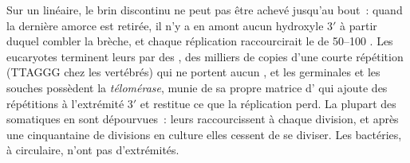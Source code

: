 \begin{proposition}\label{prop:b1:replication-mitosis:telomerase}
Sur un  linéaire, le brin discontinu ne peut pas être achevé
jusqu'au bout~: quand la dernière amorce est retirée, il n'y a en amont
aucun hydroxyle $3'$ à partir duquel combler la brèche, et chaque
réplication raccourcirait le  de \qtyrange{50}{100}{}
. Les eucaryotes terminent leurs  par des
\emph{}, des milliers de copies d'une courte répétition (TTAGGG
chez les vertébrés) qui ne portent aucun , et les 
germinales et les  souches possèdent la \emph{télomérase},
 munie de sa propre matrice d' qui ajoute des répétitions à
l'extrémité $3'$ et restitue ce que la réplication perd. La plupart des
 somatiques en sont dépourvues~: leurs  raccourcissent
à chaque division, et après une cinquantaine de divisions en culture
elles cessent de se diviser. Les bactéries, à  circulaire,
n'ont pas d'extrémités.
\end{proposition}

